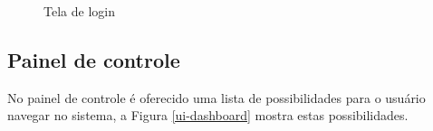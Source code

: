 \begin{figure}[H]
\caption{\label{ui-login} Tela de login}
\end{figure}

\subsection{Painel de controle}
No painel de controle é oferecido uma lista de possibilidades para o usuário navegar no sistema, a Figura \ref{ui-dashboard} mostra estas possibilidades.

